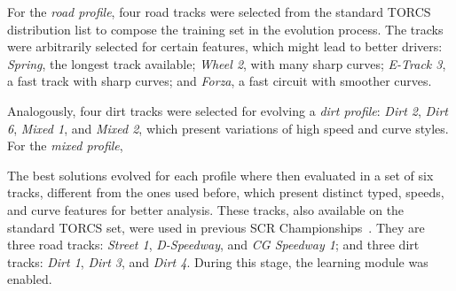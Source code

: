 For the \emph{road profile}, four road tracks were selected from the standard TORCS distribution list to compose the training set in the evolution process. The tracks were arbitrarily selected for certain features, which might lead to better drivers: \emph{Spring}, the longest track available; \emph{Wheel 2}, with many sharp curves; \emph{E-Track 3}, a fast track with sharp curves; and \emph{Forza}, a fast circuit with smoother curves.

Analogously, four dirt tracks were selected for evolving a \emph{dirt profile}: \emph{Dirt 2}, \emph{Dirt 6}, \emph{Mixed 1}, and \emph{Mixed 2}, which present variations of high speed and curve styles. For the \emph{mixed profile}, 


The best solutions evolved for each profile where then evaluated in a set of six tracks, different from the ones used before, which present distinct typed, speeds, and curve features for better analysis. These tracks, also available on the standard TORCS set, were used in previous SCR Championships~\cite{AUTOPIA2009}. They are three road tracks: \emph{Street 1}, \emph{D-Speedway}, and \emph{CG Speedway 1}; and three dirt tracks: \emph{Dirt 1}, \emph{Dirt 3}, and \emph{Dirt 4}. During this stage, the learning module was enabled.


